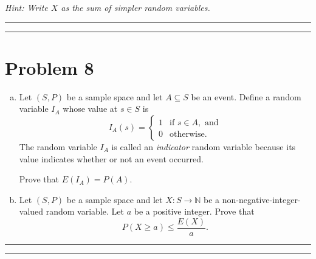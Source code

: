 \documentclass{article}
\theoremstyle{definition}
\newenvironment{solution}{\bigskip\hrule{\hfill}}{\bigskip\hrule{\hfill}} %
\begin{document}
\emph{Hint: Write $X$ as the sum of simpler random variables.}
\begin{solution}


\end{solution}


\newpage


\section*{Problem 8}

\begin{enumerate}[a)] %
    \item Let $\left(S,P\right)$ be a sample space and let $A\subseteq S$ be an event. Define a random variable $I_A$ whose value at $s\in S$ is $$I_A\left(s\right)=\begin{cases}1 & \text{if }s\in A,\text{ and} \\ 0 & \text{otherwise.}\end{cases}$$ The random variable $I_A$ is called an \emph{indicator} random variable because its value indicates whether or not an event occurred. 

    Prove that $E\left(I_A\right)=P\left(A\right)$.

    \item Let $\left(S,P\right)$ be a sample space and let $X:S\longrightarrow\mathbb{N}$ be a non-negative-integer-valued random variable. Let $a$ be a positive integer. Prove that $$P\left(X\geq a\right)\leq\frac{E\left(X\right)}{a}.$$
\end{enumerate}
\begin{solution}


\end{solution}

\end{document}
